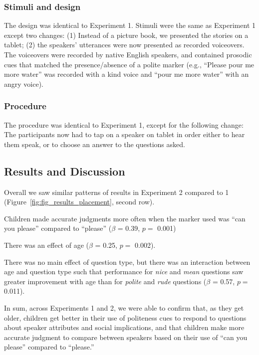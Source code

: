 \documentclass[10pt, letterpaper]{article}
\begin{document}
\subsubsection{Stimuli and design}\label{stimuli-and-design-1}

The design was identical to Experiment 1. Stimuli were the same as
Experiment 1 except two changes: (1) Instead of a picture book, we
presented the stories on a tablet; (2) the speakers' utterances were now
presented as recorded voiceovers. The voiceovers were recorded by native
English speakers, and contained prosodic cues that matched the
presence/absence of a polite marker (e.g., ``Please pour me more water''
was recorded with a kind voice and ``pour me more water'' with an angry
voice).

\subsubsection{Procedure}\label{procedure-1}

The procedure was identical to Experiment 1, except for the following
change: The participants now had to tap on a speaker on tablet in order
either to hear them speak, or to choose an answer to the questions
asked.

\subsection{Results and Discussion}\label{results-and-discussion-1}

Overall we saw similar patterns of results in Experiment 2 compared to 1
(Figure~\ref{fig:fig_results_placement}, second row).

Children made accurate judgments more often when the marker used was
``can you please'' compared to ``please'' (\(\beta\) = 0.39, \(p =\)
0.001)

There was an effect of age (\(\beta\) = 0.25, \(p =\) 0.002).

There was no main effect of question type, but there was an interaction
between age and question type such that performance for \emph{nice} and
\emph{mean} questions saw greater improvement with age than for
\emph{polite} and \emph{rude} questions (\(\beta\) = 0.57, \(p =\)
0.011).

In sum, across Experiments 1 and 2, we were able to confirm that, as
they get older, children get better in their use of politeness cues to
respond to questions about speaker attributes and social implications,
and that children make more accurate judgment to compare between
speakers based on their use of ``can you please'' compared to
``please.''
\end{document}
